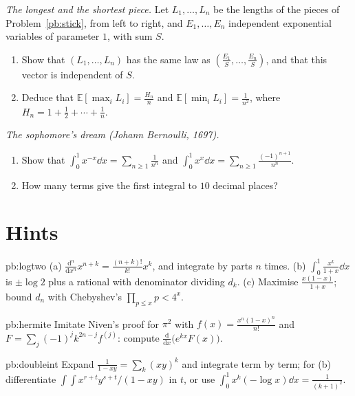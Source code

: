 \begin{exercise}[$\star\star$]\label{pb:spacings}
\emph{The longest and the shortest piece.} Let $L_1,\dots,L_n$ be the lengths of the pieces of Problem~\ref{pb:stick}, from left to right,
and $E_1,\dots,E_n$ independent exponential variables of parameter $1$, with sum $S$.
\begin{enumerate}[label=(\alph*)]
\item Show that $(L_1,\dots,L_n)$ has the same law as $(\frac{E_1}S,\dots,\frac{E_n}S)$, and that this vector is independent of $S$.
\item Deduce that $\mathbb E[\max_iL_i]=\frac{H_n}n$ and $\mathbb E[\min_iL_i]=\frac1{n^2}$, where $H_n=1+\frac12+\cdots+\frac1n$.
\end{enumerate}
\end{exercise}

\begin{exercise}[$\star$]\label{pb:sophomore}
\emph{The sophomore's dream (Johann Bernoulli, 1697).}
\begin{enumerate}[label=(\alph*)]
\item Show that $\displaystyle\int_0^1x^{-x}\dd x=\sum_{n\ge1}\frac1{n^n}$ and $\displaystyle\int_0^1x^x\dd x=\sum_{n\ge1}\frac{(-1)^{n+1}}{n^n}$.
\item How many terms give the first integral to $10$ decimal places?
\end{enumerate}
\end{exercise}

\section{Hints}

\begin{hint}{pb:logtwo}
(a) $\frac{\mathrm d^n}{\mathrm dx^n}x^{n+k}=\frac{(n+k)!}{k!}x^k$, and integrate by parts $n$ times. (b) $\int_0^1\frac{x^k}{1+x}\dd x$ is $\pm\log2$ plus a rational with
denominator dividing $d_k$. (c) Maximise $\frac{x(1-x)}{1+x}$; bound $d_n$ with Chebyshev's $\prod_{p\le x}p<4^x$.
\end{hint}

\begin{hint}{pb:hermite}
Imitate Niven's proof for $\pi^2$ with $f(x)=\frac{x^n(1-x)^n}{n!}$ and $F=\sum_j(-1)^jk^{2n-j}f^{(j)}$: compute $\frac{\mathrm d}{\mathrm dx}\bigl(e^{kx}F(x)\bigr)$.
\end{hint}

\begin{hint}{pb:doubleint}
Expand $\frac1{1-xy}=\sum_k(xy)^k$ and integrate term by term; for (b) differentiate $\int\!\!\int x^{r+t}y^{s+t}/(1-xy)$ in $t$, or use
$\int_0^1x^k(-\log x)\dd x=\frac1{(k+1)^2}$.
\end{hint}

